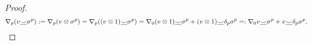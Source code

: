 \begin{proof}
  \begin{equation}
    \nabla_p(v \underline{\smile} \sigma^p)
    := \nabla_p(v \otimes \sigma^p)
    = \nabla_p((v \otimes 1) \underline{\smile} \sigma^p)
    = \nabla_0(v \otimes 1) \underline{\smile} \sigma^p
      + (v \otimes 1) \underline{\smile} \delta_p \sigma^p
    =: \nabla_0 v \underline{\smile} \sigma^p + v \underline{\smile} \delta_p \sigma^p.
  \end{equation}
\end{proof}
